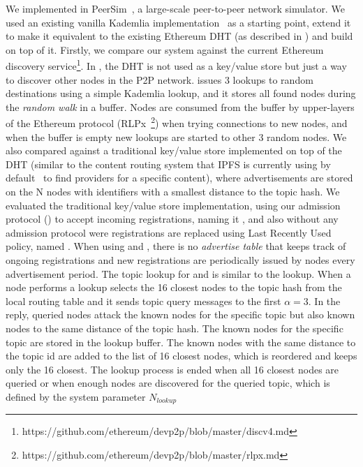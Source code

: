  We implemented \sysname in PeerSim~\cite{p2p09-peersim}, a large-scale peer-to-peer network simulator. 
We used an existing vanilla Kademlia implementation~\cite{peersim_kademlia} as a starting point, extend it to make it equivalent to the existing Ethereum DHT (as described in ) and build \sysname on top of it. 
Firstly,  we compare our system against the current Ethereum \discv discovery service\footnote{https://github.com/ethereum/devp2p/blob/master/discv4.md}.
In \discv, the DHT is not used as a key/value store but just a way to discover other nodes in the P2P network. 
\discv issues 3 lookups to random destinations using a simple Kademlia lookup,  and it stores all found nodes during the  \emph{random walk} in a buffer. 
Nodes are consumed from the buffer by upper-layers of the Ethereum protocol (RLPx~\footnote{https://github.com/ethereum/devp2p/blob/master/rlpx.md})
when trying connections to new nodes, and when the buffer is empty new lookups are started to other 3 random nodes.
We also compared \sysname against  a traditional key/value store implemented on top of the DHT (similar to the content routing system that IPFS is currently using by default~\cite{libp2p_kaddht} to find providers for a specific content),  where advertisements are stored on the N nodes with identifiers with a smallest distance  to the topic hash.  
We evaluated the traditional key/value store implementation, using our admission protocol () to accept incoming registrations,  naming it \altnameticket, and also without any admission protocol were registrations are replaced using  Last Recently Used policy, named \altname.
When using \altname and \altnameticket, there is no \emph{advertise table} that keeps track of ongoing registrations and new registrations are periodically issued by nodes every advertisement period.
The topic lookup for \altname and \altnameticket is similar to the \discv lookup.  When a node performs a lookup selects the 16 closest nodes to the topic hash from the local routing table and it sends topic query messages to the first  $\alpha=3$.
In the reply, queried nodes attack the known nodes for the specific topic but also known nodes to the same distance of the topic hash. 
The known nodes for the specific topic are stored in the lookup buffer. 
The known nodes with the same distance to the topic id are added to the list of 16 closest nodes,  which is reordered and keeps only the 16 closest.
The lookup process is ended when all 16 closest nodes are queried or when enough nodes are discovered for the queried topic, which is defined by the system parameter $N_\textit{lookup}$ 


